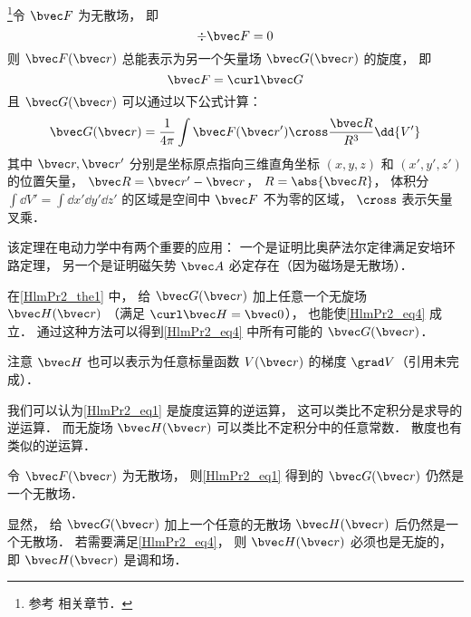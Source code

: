 
\begin{issues}
\issueTODO
\end{issues}


\begin{theorem}{}\label{HlmPr2_the1}
\footnote{参考 \cite{GriffE} 相关章节．}令 $\bvec F$ 为无散场， 即
\begin{equation}
\div \bvec F = 0
\end{equation}
则 $\bvec F(\bvec r)$ 总能表示为另一个矢量场 $\bvec G(\bvec r)$ 的旋度， 即
\begin{equation}\label{HlmPr2_eq4}
\bvec F = \curl \bvec G
\end{equation}
且 $\bvec G(\bvec r)$ 可以通过以下公式计算：
\begin{equation}\label{HlmPr2_eq1}
\bvec G(\bvec r) = \frac{1}{4\pi}\int \bvec F(\bvec r') \cross \frac{\bvec R}{R^3} \dd{V'}
\end{equation}
其中 $\bvec r, \bvec r'$ 分别是坐标原点指向三维直角坐标 $(x, y, z)$ 和 $(x', y', z')$ 的位置矢量， $\bvec R = \bvec r' - \bvec r$， $R = \abs{\bvec R}$， 体积分 $\int\dd{V'} = \int\dd{x'}\dd{y'}\dd{z'}$ 的区域是空间中 $\bvec F$ 不为零的区域， $\cross$ 表示矢量叉乘．
\end{theorem}

该定理在电动力学中有两个重要的应用： 一个是证明比奥萨法尔定律满足安培环路定理， 另一个是证明磁矢势 $\bvec A$ 必定存在（因为磁场是无散场）．

\begin{corollary}{}\label{HlmPr2_cor1}
在\autoref{HlmPr2_the1} 中， 给 $\bvec G(\bvec r)$ 加上任意一个无旋场 $\bvec H(\bvec r)$ （满足 $\curl \bvec H = \bvec 0$）， 也能使\autoref{HlmPr2_eq4} 成立． 通过这种方法可以得到\autoref{HlmPr2_eq4} 中所有可能的 $\bvec G(\bvec r)$．
\end{corollary}
注意 $\bvec H$ 也可以表示为任意标量函数 $V(\bvec r)$ 的梯度 $\grad V$（引用未完成）．

我们可以认为\autoref{HlmPr2_eq1} 是旋度运算的逆运算， 这可以类比不定积分是求导的逆运算． 而无旋场 $\bvec H(\bvec r)$ 可以类比不定积分中的任意常数． 散度也有类似的逆运算．

\begin{theorem}{}\label{HlmPr2_the2}
令 $\bvec F(\bvec r)$ 为无散场， 则\autoref{HlmPr2_eq1} 得到的 $\bvec G(\bvec r)$ 仍然是一个无散场．
\end{theorem}
显然， 给 $\bvec G(\bvec r)$ 加上一个任意的无散场 $\bvec H(\bvec r)$ 后仍然是一个无散场． 若需要满足\autoref{HlmPr2_eq4}， 则 $\bvec H(\bvec r)$ 必须也是无旋的， 即 $\bvec H(\bvec r)$ 是调和场．

